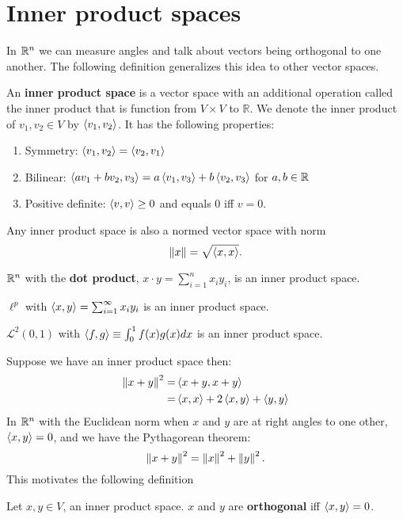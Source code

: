 \section{Inner product spaces}

In $\mathbb{R}^n$ we can measure angles and talk about vectors being
orthogonal to one another. The following definition generalizes this
idea to other vector spaces.
\begin{definition}
  An \textbf{inner product space} is a vector space with an additional
  operation called the inner product that is 
  function from $V \times V$ to $\mathbb{R}$. We denote the inner
  product of $v_1, v_2 \in V$ by $\left\langle {v_1} , {v_2} \right\rangle$. It has the
  following properties:
  \begin{enumerate}
  \item Symmetry: $\left\langle {v_1} , {v_2} \right\rangle = \left\langle {v_2} , {v_1} \right\rangle$
  \item Bilinear: $\left\langle {a v_1 + b v_2} , {v_3} \right\rangle = a \left\langle {v_1} , {v_3} \right\rangle + b
    \left\langle {v_2} , {v_3} \right\rangle$ for $a, b \in \mathbb{R}$
  \item Positive definite: $\left\langle {v} , {v} \right\rangle \geq 0$ and equals $0$ iff
    $v=0$. 
  \end{enumerate}  
\end{definition}
Any inner product space is also a normed vector space with norm
\[ \left\Vert {x} \right\Vert = \sqrt{\left\langle {x} , {x} \right\rangle}. \]
\begin{example}
  $\mathbb{R}^n$ with the \textbf{dot product}, $x \cdot y = \sum_{i=1}^n x_i
  y_i$, is an inner product space. 
\end{example}
\begin{example}
  $\ell^p$ with $\left\langle {x} , {y} \right\rangle = \sum_{i=1}^\infty x_i y_i$ is
  an inner product space.
\end{example}
\begin{example}
  $\mathcal{L}^2(0,1)$ with $\left\langle {f} , {g} \right\rangle
  \equiv \int_0^1 f(x) g(x) dx$ is an inner product space. 
\end{example}

Suppose we have an inner product space then:
\begin{align*}
  \left\Vert {x + y} \right\Vert^2 = & \left\langle {x+y} , {x+y} \right\rangle \\
  = & \left\langle {x} , {x} \right\rangle + 2\left\langle {x} , {y} \right\rangle + \left\langle {y} , {y} \right\rangle
\end{align*}
In $\mathbb{R}^n$ with the Euclidean norm when $x$ and $y$ are at right angles
to one other, $\left\langle {x} , {y} \right\rangle = 0$, and we have the Pythagorean theorem:
\[ \left\Vert {x + y} \right\Vert^2 = \left\Vert {x} \right\Vert^2 + \left\Vert {y} \right\Vert^2. \]
This motivates the following definition
\begin{definition}
  Let $x,y \in V$, an inner product space. $x$ and $y$ are
  \textbf{orthogonal} iff $\left\langle {x} , {y} \right\rangle = 0$. 
\end{definition}

